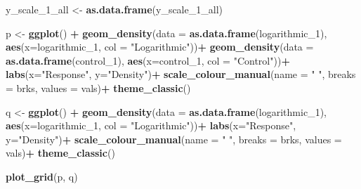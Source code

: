 \documentclass[
]{article}
\newenvironment{Shaded}{\begin{snugshade}}{\end{snugshade}}
\newcommand{\DataTypeTok}[1]{\textcolor[rgb]{0.13,0.29,0.53}{#1}}
\newcommand{\DecValTok}[1]{\textcolor[rgb]{0.00,0.00,0.81}{#1}}
\newcommand{\KeywordTok}[1]{\textcolor[rgb]{0.13,0.29,0.53}{\textbf{#1}}}
\newcommand{\NormalTok}[1]{#1}
\newcommand{\OperatorTok}[1]{\textcolor[rgb]{0.81,0.36,0.00}{\textbf{#1}}}
\newcommand{\StringTok}[1]{\textcolor[rgb]{0.31,0.60,0.02}{#1}}
\begin{document}
\begin{Shaded}
\begin{Highlighting}[]
\NormalTok{y_scale_}\DecValTok{1}\NormalTok{_all <-}\StringTok{ }\KeywordTok{as.data.frame}\NormalTok{(y_scale_}\DecValTok{1}\NormalTok{_all)}

\NormalTok{ p <-}\StringTok{ }\KeywordTok{ggplot}\NormalTok{() }\OperatorTok{+}
\StringTok{  }\KeywordTok{geom_density}\NormalTok{(}\DataTypeTok{data =} \KeywordTok{as.data.frame}\NormalTok{(logarithmic_}\DecValTok{1}\NormalTok{), }\KeywordTok{aes}\NormalTok{(}\DataTypeTok{x=}\NormalTok{logarithmic_}\DecValTok{1}\NormalTok{, }\DataTypeTok{col =} \StringTok{"Logarithmic"}\NormalTok{))}\OperatorTok{+}
\StringTok{  }\KeywordTok{geom_density}\NormalTok{(}\DataTypeTok{data =} \KeywordTok{as.data.frame}\NormalTok{(control_}\DecValTok{1}\NormalTok{), }\KeywordTok{aes}\NormalTok{(}\DataTypeTok{x=}\NormalTok{control_}\DecValTok{1}\NormalTok{, }\DataTypeTok{col =} \StringTok{"Control"}\NormalTok{))}\OperatorTok{+}
\StringTok{  }\KeywordTok{labs}\NormalTok{(}\DataTypeTok{x=}\StringTok{"Response"}\NormalTok{, }\DataTypeTok{y=}\StringTok{"Density"}\NormalTok{)}\OperatorTok{+}
\StringTok{  }\KeywordTok{scale_colour_manual}\NormalTok{(}\DataTypeTok{name =} \StringTok{" "}\NormalTok{, }\DataTypeTok{breaks =}\NormalTok{ brks, }\DataTypeTok{values =}\NormalTok{ vals)}\OperatorTok{+}
\StringTok{  }\KeywordTok{theme_classic}\NormalTok{()}
 
\NormalTok{q <-}\StringTok{ }\KeywordTok{ggplot}\NormalTok{() }\OperatorTok{+}
\StringTok{  }\KeywordTok{geom_density}\NormalTok{(}\DataTypeTok{data =} \KeywordTok{as.data.frame}\NormalTok{(logarithmic_}\DecValTok{1}\NormalTok{), }\KeywordTok{aes}\NormalTok{(}\DataTypeTok{x=}\NormalTok{logarithmic_}\DecValTok{1}\NormalTok{, }\DataTypeTok{col =} \StringTok{"Logarithmic"}\NormalTok{))}\OperatorTok{+}
\StringTok{  }\KeywordTok{labs}\NormalTok{(}\DataTypeTok{x=}\StringTok{"Response"}\NormalTok{, }\DataTypeTok{y=}\StringTok{"Density"}\NormalTok{)}\OperatorTok{+}
\StringTok{  }\KeywordTok{scale_colour_manual}\NormalTok{(}\DataTypeTok{name =} \StringTok{" "}\NormalTok{, }\DataTypeTok{breaks =}\NormalTok{ brks, }\DataTypeTok{values =}\NormalTok{ vals)}\OperatorTok{+}
\StringTok{  }\KeywordTok{theme_classic}\NormalTok{()}
\end{Highlighting}
\end{Shaded}

\begin{Shaded}
\begin{Highlighting}[]
\KeywordTok{plot_grid}\NormalTok{(p, q)}
\end{Highlighting}
\end{Shaded}
\end{document}
